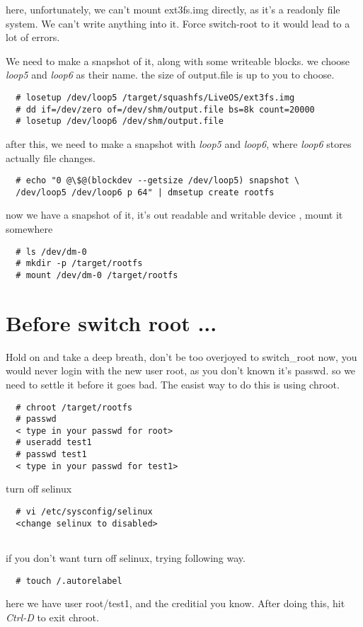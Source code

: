 here, unfortunately, we can't mount ext3fs.img directly, as it's a readonly file system. We can't write anything into it. Force switch-root to it would lead to a lot of errors.

We need to make a snapshot of it, along with some writeable blocks. we choose \emph{loop5} and \emph{loop6} as their name. the size of output.file is up to you to choose.
\begin{lstlisting}
  # losetup /dev/loop5 /target/squashfs/LiveOS/ext3fs.img
  # dd if=/dev/zero of=/dev/shm/output.file bs=8k count=20000 
  # losetup /dev/loop6 /dev/shm/output.file
\end{lstlisting}

after this, we need to make a snapshot with \emph{loop5} and \emph{loop6}, where \emph{loop6} stores actually file changes.

\begin{lstlisting}
  # echo "0 @\$@(blockdev --getsize /dev/loop5) snapshot \
  /dev/loop5 /dev/loop6 p 64" | dmsetup create rootfs
\end{lstlisting}

now we have a snapshot of it, it's out readable and writable device , mount it somewhere
\begin{lstlisting}
  # ls /dev/dm-0
  # mkdir -p /target/rootfs
  # mount /dev/dm-0 /target/rootfs
\end{lstlisting}


  
\section{Before switch root ...}
Hold on and take a deep breath, don't be too overjoyed to switch\_root now, you would never login with the new user root, as you don't known it's passwd.
so we need to settle it before it goes bad. The easist way to do this is using chroot. 
\begin{lstlisting}
  # chroot /target/rootfs
  # passwd
  < type in your passwd for root>
  # useradd test1
  # passwd test1
  < type in your passwd for test1>
\end{lstlisting}

turn off selinux

\begin{lstlisting}
  # vi /etc/sysconfig/selinux  
  <change selinux to disabled>
  
\end{lstlisting}

if you don't want turn off selinux, trying following way.
\begin{lstlisting}
  # touch /.autorelabel
\end{lstlisting}
here we have user root/test1, and the creditial you know. After doing this, hit \emph{Ctrl-D} to exit chroot. 

